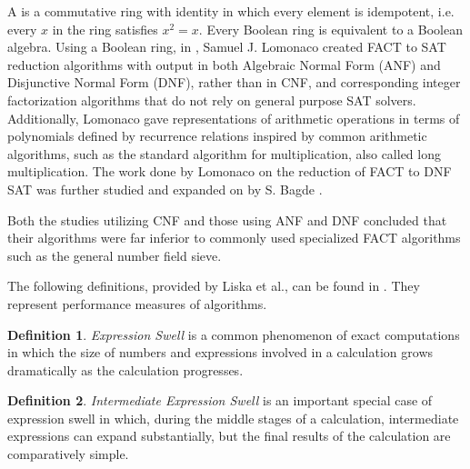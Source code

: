 \documentclass{article}
\theoremstyle{theorem}
\theoremstyle{definition}
\newtheorem*{definition}{Definition}
\theoremstyle{definition}
\begin{document}
A  is a commutative ring with identity in which every element is idempotent, i.e. every $x$ in the ring satisfies $x^2=x$. Every Boolean ring is equivalent to a Boolean algebra. Using a Boolean ring, in \cite{Lomonaco}, Samuel J. Lomonaco created FACT to SAT reduction algorithms with output in both Algebraic Normal Form (ANF) and Disjunctive Normal Form (DNF), rather than in CNF, and corresponding integer factorization algorithms that do not rely on general purpose SAT solvers. Additionally, Lomonaco gave representations of arithmetic operations in terms of polynomials defined by recurrence relations inspired by common arithmetic algorithms, such as the standard algorithm for multiplication, also called long multiplication. The work done by Lomonaco on the reduction of FACT to DNF SAT was further studied and expanded on by S. Bagde \cite{Bagd/2013}.

Both the studies utilizing CNF and those using ANF and DNF concluded that their algorithms were far inferior to commonly used specialized FACT algorithms such as the general number field sieve. 

The following definitions, provided by Liska et al., can be found in \cite{Liska}. They represent performance measures of algorithms.

\begin{definition}
\textit{Expression Swell} is a common phenomenon of exact computations in which the size of numbers and expressions involved in a calculation grows dramatically as the calculation progresses.
\end{definition}

\begin{definition}
\textit{Intermediate Expression Swell} is an important special case of expression swell in which, during the middle stages of a calculation, intermediate expressions can expand substantially, but the final results of the calculation are comparatively simple.
\end{definition}
\end{document}
